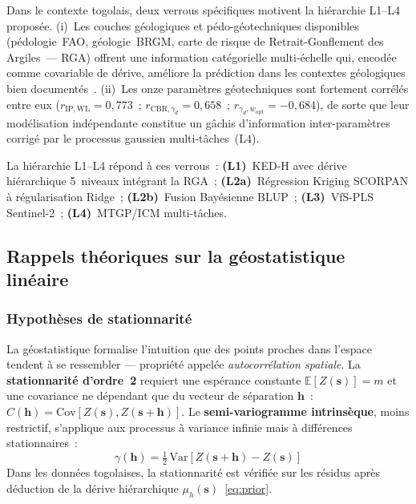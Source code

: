 \documentclass[10pt,a4paper,twocolumn]{article}
\newcommand{\bs}{\mathbf{s}}
\begin{document}
	Dans le contexte togolais, deux verrous spécifiques motivent la
	hiérarchie L1--L4 proposée.
	(i)~Les couches géologiques et pédo-géotechniques disponibles
	(pédologie~FAO, géologie~BRGM, carte de risque de Retrait-Gonflement
	des Argiles~--- RGA) offrent une information catégorielle multi-échelle
	qui, encodée comme covariable de dérive, améliore la prédiction dans
	les contextes géologiques bien documentés~\cite{odeh1994further}.
	(ii)~Les onze paramètres géotechniques sont fortement corrélés entre eux
	($r_{\mathrm{IP,WL}}=0{,}773$~; $r_{\mathrm{CBR},\gamma_d}=0{,}658$~;
	$r_{\gamma_d,w_{\mathrm{opt}}}=-0{,}684$), de sorte que leur modélisation
	indépendante constitue un gâchis d'information inter-paramètres corrigé
	par le processus gaussien multi-tâches~(L4).
	
	La hiérarchie L1--L4 répond à ces verrous~:
	\textbf{(L1)}~KED-H avec dérive hiérarchique 5~niveaux intégrant la RGA~;
	\textbf{(L2a)}~Régression Kriging SCORPAN à régularisation Ridge~;
	\textbf{(L2b)}~Fusion Bayésienne BLUP~;
	\textbf{(L3)}~VfS-PLS Sentinel-2~;
	\textbf{(L4)}~MTGP/ICM multi-tâches.
	
	\subsection{Rappels théoriques sur la géostatistique linéaire}
	\label{sec:theorie}
	
	\subsubsection{Hypothèses de stationnarité}
	
	La géostatistique formalise l'intuition que des points proches dans
	l'espace tendent à se ressembler --- propriété appelée
	\emph{autocorrélation spatiale}.
	La \textbf{stationnarité d'ordre~2} requiert une espérance constante
	$\mathbb{E}[Z(\bs)]=m$ et une covariance ne dépendant que du vecteur
	de séparation $\mathbf{h}$~:
	$C(\mathbf{h})=\mathrm{Cov}[Z(\bs),Z(\bs+\mathbf{h})]$.
	Le \textbf{semi-variogramme intrinsèque}, moins restrictif, s'applique
	aux processus à variance infinie mais à différences stationnaires~:
	\begin{equation}
		\gamma(\mathbf{h})=\tfrac{1}{2}\,\mathrm{Var}
		[Z(\bs+\mathbf{h})-Z(\bs)]
		\label{eq:variogram}
	\end{equation}
	Dans les données togolaises, la stationnarité est vérifiée sur les
	résidus après déduction de la dérive hiérarchique
	$\mu_h(\bs)$~\eqref{eq:prior}.
	
\end{document}
